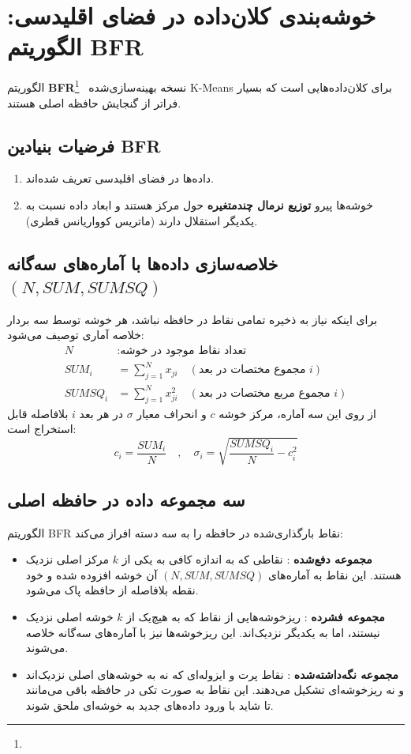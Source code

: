 \section{خوشه‌بندی کلان‌داده در فضای اقلیدسی: الگوریتم BFR}
الگوریتم \textbf{BFR}\footnote{}~\cite{bradley1998scaling} نسخه بهینه‌سازی‌شده K-Means برای کلان‌داده‌هایی است که بسیار فراتر از گنجایش حافظه اصلی هستند.

\subsection{فرضیات بنیادین BFR}
\begin{enumerate}
    \item داده‌ها در فضای اقلیدسی تعریف شده‌اند.
    \item خوشه‌ها پیرو \textbf{توزیع نرمال چندمتغیره} حول مرکز هستند و ابعاد داده نسبت به یکدیگر استقلال دارند (ماتریس کوواریانس قطری).
\end{enumerate}

\subsection{خلاصه‌سازی داده‌ها با آماره‌های سه‌گانه \texorpdfstring{$(N, SUM, SUMSQ)$}{(N, SUM, SUMSQ)}}
برای اینکه نیاز به ذخیره تمامی نقاط در حافظه نباشد، هر خوشه توسط سه بردار خلاصه آماری توصیف می‌شود:
\begin{align}
N &: \text{تعداد نقاط موجود در خوشه} \\
SUM_i &= \sum_{j=1}^N x_{ji} \quad (\text{مجموع مختصات در بعد } i) \\
SUMSQ_i &= \sum_{j=1}^N x_{ji}^2 \quad (\text{مجموع مربع مختصات در بعد } i)
\end{align}
از روی این سه آماره، مرکز خوشه $c$ و انحراف معیار $\sigma$ در هر بعد $i$ بلافاصله قابل استخراج است:
\begin{equation}
c_i = \frac{SUM_i}{N} \quad , \quad \sigma_i = \sqrt{\frac{SUMSQ_i}{N} - c_i^2}
\end{equation}

\subsection{سه مجموعه داده در حافظه اصلی}
الگوریتم BFR نقاط بارگذاری‌شده در حافظه را به سه دسته افراز می‌کند:
\begin{itemize}
    \item \textbf{مجموعه دفع‌شده }: نقاطی که به اندازه کافی به یکی از $k$ مرکز اصلی نزدیک هستند. این نقاط به آماره‌های $(N, SUM, SUMSQ)$ آن خوشه افزوده شده و خود نقطه بلافاصله از حافظه پاک می‌شود.
    \item \textbf{مجموعه فشرده }: ریزخوشه‌هایی از نقاط که به هیچ‌یک از $k$ خوشه اصلی نزدیک نیستند، اما به یکدیگر نزدیک‌اند. این ریزخوشه‌ها نیز با آماره‌های سه‌گانه خلاصه می‌شوند.
    \item \textbf{مجموعه نگه‌داشته‌شده }: نقاط پرت و ایزوله‌ای که نه به خوشه‌های اصلی نزدیک‌اند و نه ریزخوشه‌ای تشکیل می‌دهند. این نقاط به صورت تکی در حافظه باقی می‌مانند تا شاید با ورود داده‌های جدید به خوشه‌ای ملحق شوند.
\end{itemize}

